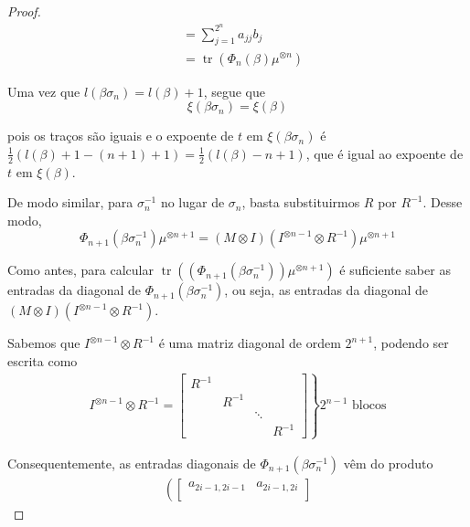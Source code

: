 \documentclass[a4paper,portuguese,11pt,twoside, leqno]{book}
\DeclareMathOperator{\tr}{tr}
\theoremstyle{definition}
\begin{document}
\begin{proof}
\begin{align*}
		&= \sum_{j=1}^{2^n}a_{jj}b_j \\
		&= \tr ( \Phi_n(\beta)\mu^{\otimes n}  )
		\end{align*}
		\par\vspace{0.3cm} Uma vez que $l(\beta\sigma_n) = l(\beta) + 1$, segue que
		\begin{equation*}
		\xi(\beta\sigma_n) = \xi(\beta)
		\end{equation*}
		\par\vspace{0.3cm} pois os traços são iguais e o expoente de $t$ em $\xi(\beta\sigma_n)$ é $\displaystyle{ \frac{1}{2}(l(\beta) + 1 - (n +1) + 1) = \frac{1}{2}( l(\beta) - n + 1 ) }$, que é igual ao expoente de $t$ em $\xi(\beta)$.
		\par\vspace{0.3cm} De modo similar, para $\sigma_n^{-1}$ no lugar de $\sigma_n$, basta substituirmos $R$ por $R^{-1}$. Desse modo, 
		\begin{equation*}
		\Phi_{n+1}(\beta\sigma_n^{-1})\mu^{\otimes n+1} = (M\otimes I)(I^{\otimes n-1}\otimes R^{-1})\mu^{\otimes n+1}
		\end{equation*}
		\par\vspace{0.3cm} Como antes, para calcular $\tr ( (\Phi_{n+1}(\beta\sigma_n^{-1}))\mu^{\otimes n+1} )$ é suficiente saber as entradas da diagonal de $ \Phi_{n+1}(\beta\sigma_n^{-1}) $, ou seja, as entradas da diagonal de $(M\otimes I)(I^{\otimes n-1}\otimes R^{-1})$. 
		\par\vspace{0.3cm} Sabemos que $I^{\otimes n-1}\otimes R^{-1}$ é uma matriz diagonal de ordem $2^{n+1}$, podendo ser escrita como
		\begin{align*}
		I^{\otimes n-1}\otimes R^{-1} = \left. \begin{bmatrix}
		R^{-1} \\
		& R^{-1} \\
		& & \ddots \\
		& & & R^{-1}
		\end{bmatrix} \right\} 2^{n-1}\text{ blocos}
		\end{align*}
		\par\vspace{0.3cm} Consequentemente, as entradas diagonais de $\Phi_{n+1}(\beta\sigma_n^{-1})$ vêm do produto
		\begin{align*}
		\left( \begin{bmatrix}
		a_{2i-1,2i-1} & a_{2i-1,2i} \\

\end{bmatrix}
\end{align*}
\end{proof}
\end{document}
